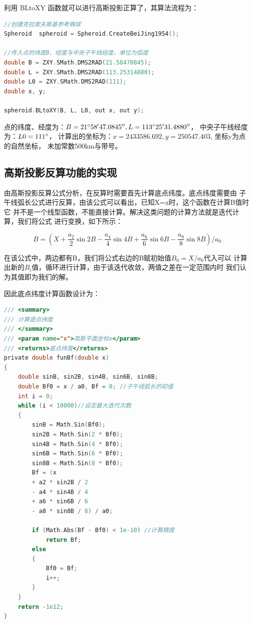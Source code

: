 利用 BLtoXY 函数就可以进行高斯投影正算了，其算法流程为：

\begin{lstlisting}[language=C]
//创建克拉索夫斯基参考椭球
Spheroid  spheroid = Spheroid.CreateBeiJing1954();

//传入点的纬度B、经度与中央子午线经度，单位为弧度
double B = ZXY.SMath.DMS2RAD(21.58470845);
double L = ZXY.SMath.DMS2RAD(113.25314880);
double L0 = ZXY.SMath.DMS2RAD(111);
double x, y;

spheroid.BLtoXY(B, L, L0, out x, out y);
\end{lstlisting}

点的纬度、经度为：$ B = 21 ^\circ 58'47.0845'',  L= 113^\circ 25'31.4880''$，
中央子午线经度为：$L0 = 111^\circ$，
计算出的坐标为：$x=2433586.692, y=250547.403$, 坐标y为点的自然坐标，
未加常数500km与带号。

\subsection{高斯投影反算功能的实现}
由高斯投影反算公式分析，在反算时需要首先计算底点纬度。底点纬度需要由
子午线弧长公式进行反算，由该公式可以看出，已知X=x时，这个函数在计算B值时它
并不是一个线型函数，不能直接计算。解决这类问题的计算方法就是迭代计算，我们将公式
进行变换，如下所示：

$$B= (X + \frac{a_2}{2}\sin 2B - \frac{a_4}{4}\sin 4B
+ \frac{a_6}{6} \sin 6B  - \frac{a_8}{8}\sin 8B)/a_0$$

在该公式中，两边都有B，我们将公式右边的B赋初始值$B_0=X/a_0$代入可以
计算出新的$B_i$值，循环进行计算，由于该迭代收敛，两值之差在一定范围内时
我们认为其值即为我们的解。

因此底点纬度计算函数设计为：

\begin{lstlisting}[language=C]
/// <summary>
/// 计算底点纬度
/// </summary>
/// <param name="x">高斯平面坐标x</param>
/// <returns>底点纬度</returns>
private double funBf(double x)
{
    double sinB, sin2B, sin4B, sin6B, sin8B;
    double Bf0 = x / a0, Bf = 0; //子午线弧长的初值
    int i = 0;
    while (i < 10000)//设定最大迭代次数
    {
        sinB = Math.Sin(Bf0);
        sin2B = Math.Sin(2 * Bf0);
        sin4B = Math.Sin(4 * Bf0);
        sin6B = Math.Sin(6 * Bf0);
        sin8B = Math.Sin(8 * Bf0);
        Bf = (x
        + a2 * sin2B / 2
        - a4 * sin4B / 4
        + a6 * sin6B / 6
        - a8 * sin8B / 8) / a0;

        if (Math.Abs(Bf - Bf0) < 1e-10) //计算精度
            return Bf;
        else
        {
            Bf0 = Bf;
            i++;
        }
    }
    return -1e12;
}
\end{lstlisting}

